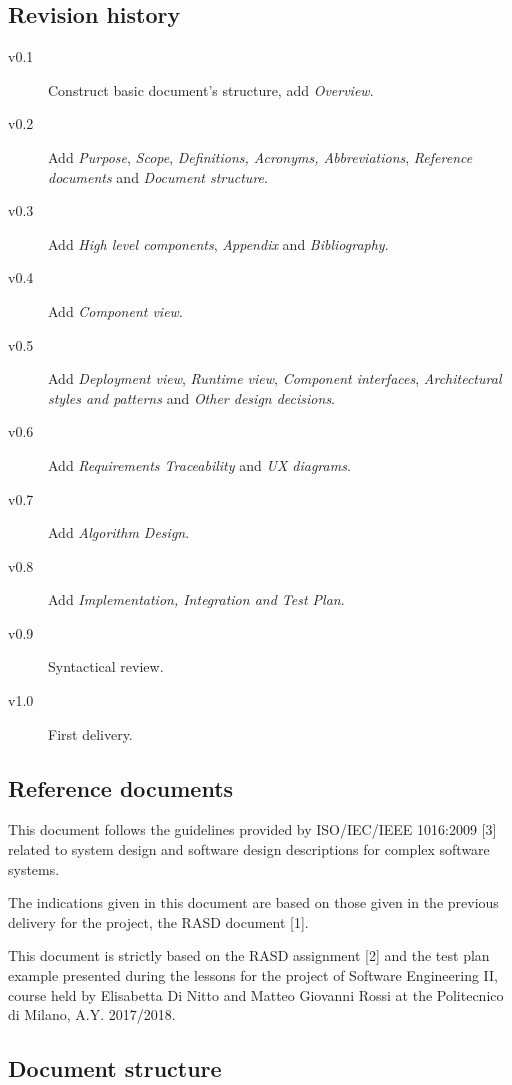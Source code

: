 \documentclass{article}
\begin{document}
	\subsection{Revision history}
	\begin{description}
		\item [v0.1] Construct basic document's structure, add \textit{Overview}.
		\item [v0.2] Add \textit{Purpose}, \textit{Scope}, \textit{Definitions, Acronyms, Abbreviations}, \textit{Reference documents} and \textit{Document structure}.
		\item [v0.3] Add \textit{High level components}, \textit{Appendix} and \textit{Bibliography}.
		\item [v0.4] Add \textit{Component view}.
		\item [v0.5] Add \textit{Deployment view}, \textit{Runtime view}, \textit{Component interfaces}, \textit{Architectural styles and patterns} and \textit{Other design decisions}.
		\item [v0.6] Add \textit{Requirements Traceability} and \textit{UX diagrams}.
		\item [v0.7] Add \textit{Algorithm Design}.
		\item [v0.8] Add \textit{Implementation, Integration and Test Plan}.
		\item [v0.9] Syntactical review.
		\item [v1.0] First delivery.
	\end{description}
	
	
	\subsection{Reference documents}
	This document follows the guidelines provided by ISO/IEC/IEEE 1016:2009 [3] related to system design and software design descriptions for complex software systems.

	\bigskip
	The indications given in this document are based on those given in the previous delivery for the project, the RASD document [1].
	
	\bigskip
	This document is strictly based on the RASD assignment [2] and the test plan example presented during the lessons for the project of Software Engineering II, course held by Elisabetta Di Nitto and Matteo Giovanni Rossi at the Politecnico di Milano, A.Y. 2017/2018.
	
	
	\subsection{Document structure}
\end{document}
